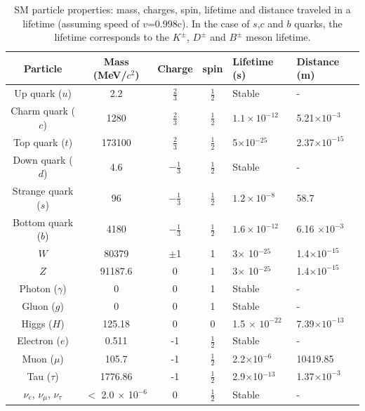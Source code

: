 \begin{table}[htp]
\caption[Table of particles in SM]{SM particle properties: mass, charges, spin, lifetime and distance traveled in a lifetime (assuming speed of $v$=0.998c)\cite{pd}. In the case of $s$,$c$ and $b$ quarks, the lifetime corresponds to the $K^\pm$, $D^{\pm}$ and $B^{\pm}$ meson lifetime.}
\renewcommand{\arraystretch}{1.5}
\begin{tabular}{|c|c|c|c|p{2.5cm}|p{2.5cm}|}
\hline 
Particle& Mass (MeV/$c^2$) &Charge & spin &Lifetime (s) & Distance (m) \\ 
	\hline 
Up quark ($u$)	& 2.2 & $\frac{2}{3}$ & $\frac{1}{2}$ & Stable & -\\ 
	\hline 
Charm quark ($c$)	& 1280 &$\frac{2}{3}$ & $\frac{1}{2}$ & $ 1.1 \times 10^{-12}$ & 5.21$\times 10^{-3}$ \\ 
	\hline 
Top	quark ($t$)& 173100 & $\frac{2}{3}$ & $\frac{1}{2}$ & 5$\times$10$^{-25}$ &2.37$\times 10^{-15}$  \\ 
	\hline 
Down quark ($d$)	& 4.6 &$-\frac{1}{3}$ & $\frac{1}{2}$ & Stable & - \\ 
	\hline 
Strange quark ($s$)	& 96 &$-\frac{1}{3}$ & $\frac{1}{2}$ &$1.2 \times 10^{-8}$ & 58.7 \\ 
	\hline 
Bottom quark ($b$)	& 4180 &$-\frac{1}{3}$ & $\frac{1}{2}$ &$1.6 \times 10^{-12}$  & 6.16 $\times 10^{-3}$\\ 
	\hline 
$W$ 	& 80379 &$\pm$1 & 1 & 3$\times$ 10$^{-25}$ & 1.4$\times 10^{-15}$\\ 
	\hline 
$Z$ & 91187.6 &0 & 1 & 3$\times$ 10$^{-25}$ &1.4$\times 10^{-15}$ \\ 
\hline
Photon ($\gamma$) & 0 &0 & 1&Stable & - \\ 
\hline
Gluon ($g$)	& 0 &0 & 1&Stable & - \\ 
	\hline 
Higgs ($H$)	& 125.18 &0 & 0& 1.5 $\times$ $10^{-22}$ & 7.39$\times 10^{-13}$ \\ 
	\hline 
Electron ($e$)& 0.511 & -1 &  $\frac{1}{2}$& Stable & - \\ 
	\hline 
Muon ($\mu$)	& 105.7 & -1 & $\frac{1}{2}$ & 2.2$\times$10$^{-6}$ & 10419.85 \\ 
	\hline 
Tau ($\tau$)	& 1776.86 &-1 & $\frac{1}{2}$ & 2.9$\times$10$^{-13}$ & 1.37$\times 10^{-3}$\\ 
	\hline 
$\nu_e$, $\nu_\mu$, $\nu_\tau$&  $<$ 2.0 $\times$ 10$^{-6}$ & 0 & $\frac{1}{2}$ & Stable & -\\
	\hline 
\end{tabular} 
\label{SM table}
\end{table}

